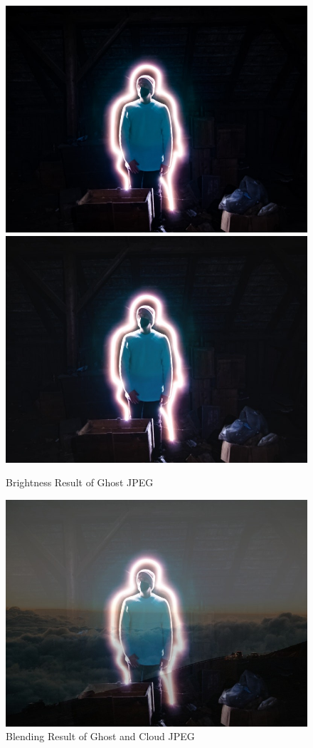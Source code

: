 \documentclass{article}
\begin{document}
\begin{figure}[h]
\includegraphics[width=\textwidth]{./labwork/data/ghost.jpeg}
\includegraphics[width=\textwidth]{./labwork6-gpu-out-brightness.jpg}
\caption{Brightness Result of Ghost JPEG}
\end{figure}

\begin{figure}[h]
\includegraphics[width=\textwidth]{./labwork6-gpu-out-blending.jpg}
\caption{Blending Result of Ghost and Cloud JPEG}
\end{figure}
\end{document}
